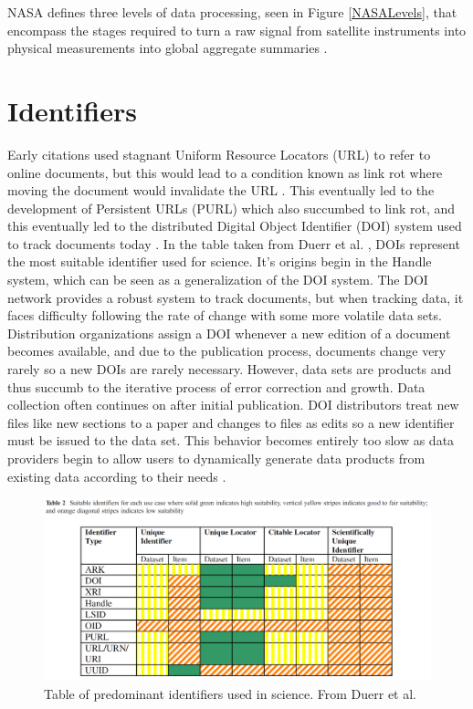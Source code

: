 NASA defines three levels of data processing, seen in Figure \ref{NASALevels}, that encompass the stages required to turn a raw signal from satellite instruments into physical measurements into global aggregate summaries \cite{Barkstrom2003}.

\section{Identifiers}

Early citations used stagnant Uniform Resource Locators (URL) to refer to online documents, but this would lead to a condition known as link rot where moving the document would invalidate the URL \cite{Lyons2005}.
This eventually led to the development of Persistent URLs (PURL) which also succumbed to link rot, and this eventually led to the distributed Digital Object Identifier (DOI) system used to track documents today \cite{Duerr2011}.
In the table taken from Duerr et al. \cite{Duerr2011}, DOIs represent the most suitable identifier used for science.
It's origins begin in the Handle system, which can be seen as a generalization of the DOI system.
The DOI network provides a robust system to track documents, but when tracking data, it faces difficulty following the rate of change with some more volatile data sets.
Distribution organizations assign a DOI whenever a new edition of a document becomes available, and due to the publication process, documents change very rarely so a new DOIs are rarely necessary.
However, data sets are products and thus succumb to the iterative process of error correction and growth.
Data collection often continues on after initial publication.
DOI distributors treat new files like new sections to a paper and changes to files as edits so a new identifier must be issued to the data set.
This behavior becomes entirely too slow as data providers begin to allow users to dynamically generate data products from existing data according to their needs \cite{Barkstrom2003a}.

\begin{figure}
	\centering
	\includegraphics[scale=0.30]{figures/DigitalIdentifierTable.png}
	\caption{Table of predominant identifiers used in science.  From Duerr et al. \cite{Duerr2011}}
	\label{table:Duerr}
\end{figure}

